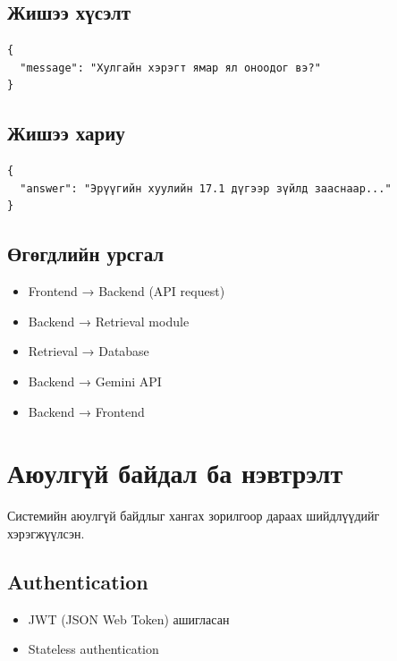 \subsection{Жишээ хүсэлт}

\begin{verbatim}
{
  "message": "Хулгайн хэрэгт ямар ял оноодог вэ?"
}
\end{verbatim}

\subsection{Жишээ хариу}

\begin{verbatim}
{
  "answer": "Эрүүгийн хуулийн 17.1 дүгээр зүйлд зааснаар..."
}
\end{verbatim}

\subsection{Өгөгдлийн урсгал}

\begin{itemize}
    \item Frontend → Backend (API request)
    \item Backend → Retrieval module
    \item Retrieval → Database
    \item Backend → Gemini API
    \item Backend → Frontend
\end{itemize}


\section{Аюулгүй байдал ба нэвтрэлт}

Системийн аюулгүй байдлыг хангах зорилгоор дараах шийдлүүдийг хэрэгжүүлсэн.

\subsection{Authentication}

\begin{itemize}
    \item JWT (JSON Web Token) ашигласан
    \item Stateless authentication
\end{itemize}

